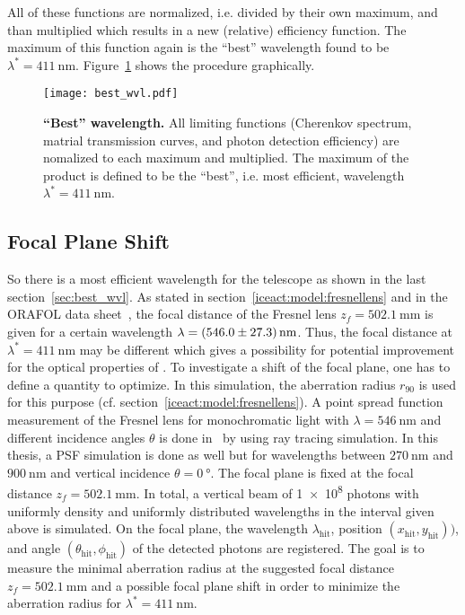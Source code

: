 All of these functions are normalized, i.e. divided by their own maximum, and than multiplied which results in a new (relative) efficiency function. The maximum of this function again is the \enquote{best} wavelength found to be $\lambda^\ast = \SI{411}{\nano\meter}$. Figure~\ref{best_wvl} shows the procedure graphically. 

\begin{figure}[H]
	\centering
	\texttt{[image: best\_wvl.pdf]}
	\caption[\enquote{Best} wavelength]{\textbf{\enquote{Best} wavelength.} All limiting functions (Cherenkov spectrum, matrial transmission curves, and photon detection efficiency) are nomalized to each maximum and multiplied. The maximum of the product is defined to be the \enquote{best}, i.e. most efficient, wavelength $\lambda^\ast=\SI{411}{\nano\meter}$.}
	\label{best_wvl}
\end{figure}

\subsection{Focal Plane Shift}\label{sec:focalplaneshift}

So there is a most efficient wavelength for the \iceact telescope as shown in the last section~\ref{sec:best_wvl}. As stated in section~\ref{iceact:model:fresnellens} and in the ORAFOL data sheet~\cite{iceact:fresnellens:datasheet}, the focal distance of the Fresnel lens $z_f=\SI{502.1}{\milli\meter}$ is given for a certain wavelength $\lambda=\SI{546+-27.3}{\nano\meter}$. Thus, the focal distance at $\lambda^\ast=\SI{411}{\nano\meter}$ may be different which gives a possibility for potential improvement for the optical properties of \iceact. To investigate a shift of the focal plane, one has to define a quantity to optimize. In this simulation, the aberration radius $r_{90}$ is used for this purpose (cf. section~\ref{iceact:model:fresnellens}). A point spread function measurement of the Fresnel lens for monochromatic light with $\lambda=\SI{546}{\nano\meter}$ and different incidence angles $\theta$ is done in~\cite{famous:niggemann} by using ray tracing simulation. In this thesis, a PSF simulation is done as well but for wavelengths between $\SI{270}{\nano\meter}$ and $\SI{900}{\nano\meter}$ and vertical incidence $\theta=\SI{0}{\degree}$. The focal plane is fixed at the focal distance $z_f=\SI{502.1}{\milli\meter}$. In total, a vertical beam of \num{1e8} photons with uniformly density and uniformly distributed wavelengths in the interval given above is simulated. On the focal plane, the wavelength $\lambda_\text{hit}$, position $(x_\text{hit},y_\text{hit}))$, and angle $(\theta_\text{hit},\phi_\text{hit})$ of the detected photons are registered. The goal is to measure the minimal aberration radius at the suggested focal distance $z_f=\SI{502.1}{\milli\meter}$ and a possible focal plane shift in order to minimize the aberration radius for $\lambda^\ast=\SI{411}{\nano\meter}$.\\

